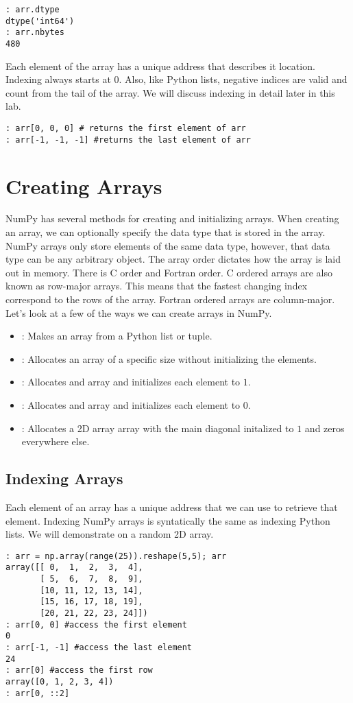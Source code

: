 \begin{lstlisting}
: arr.dtype
dtype('int64')
: arr.nbytes
480
\end{lstlisting}

Each element of the array has a unique address that describes it location.  Indexing always starts at $0$.  Also, like Python lists, negative indices are valid and count from the tail of the array.  We will discuss indexing in detail later in this lab.

\begin{lstlisting}
: arr[0, 0, 0] # returns the first element of arr
: arr[-1, -1, -1] #returns the last element of arr
\end{lstlisting}

\section*{Creating Arrays}
NumPy has several methods for creating and initializing arrays.  When creating an array, we can optionally specify the data type that is stored in the array.  NumPy arrays only store elements of the same data type, however, that data type can be any arbitrary object.  The array order dictates how the array is laid out in memory.  There is C order and Fortran order.  C ordered arrays are also known as row-major arrays.  This means that the fastest changing index correspond to the rows of the array.  Fortran ordered arrays are column-major.  Let's look at a few of the ways we can create arrays in NumPy.
\begin{itemize}
\item {}: Makes an array from a Python list or tuple.
\item {}: Allocates an array of a specific size without initializing the elements.
\item {}: Allocates and array and initializes each element to $1$.
\item {}: Allocates and array and initializes each element to $0$.
\item {}: Allocates a 2D array array with the main diagonal initalized to $1$ and zeros everywhere else.
\end{itemize}

\subsection*{Indexing Arrays}
Each element of an array has a unique address that we can use to retrieve that element.  Indexing NumPy arrays is syntatically the same as indexing Python lists.  We will demonstrate on a random 2D array.

\begin{lstlisting}
: arr = np.array(range(25)).reshape(5,5); arr
array([[ 0,  1,  2,  3,  4],
       [ 5,  6,  7,  8,  9],
       [10, 11, 12, 13, 14],
       [15, 16, 17, 18, 19],
       [20, 21, 22, 23, 24]])
: arr[0, 0] #access the first element
0
: arr[-1, -1] #access the last element
24
: arr[0] #access the first row
array([0, 1, 2, 3, 4])
: arr[0, ::2]
\end{lstlisting}
